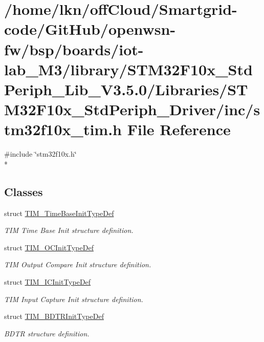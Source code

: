 \hypertarget{iot-lab___m3_2library_2_s_t_m32_f10x___std_periph___lib___v3_85_80_2_libraries_2_s_t_m32_f10x___9dc3c5d9a4f25b71424760fe6601bdaf}{}\section{/home/lkn/off\+Cloud/\+Smartgrid-\/code/\+Git\+Hub/openwsn-\/fw/bsp/boards/iot-\/lab\+\_\+\+M3/library/\+S\+T\+M32\+F10x\+\_\+\+Std\+Periph\+\_\+\+Lib\+\_\+\+V3.5.0/\+Libraries/\+S\+T\+M32\+F10x\+\_\+\+Std\+Periph\+\_\+\+Driver/inc/stm32f10x\+\_\+tim.h File Reference}
\label{iot-lab___m3_2library_2_s_t_m32_f10x___std_periph___lib___v3_85_80_2_libraries_2_s_t_m32_f10x___9dc3c5d9a4f25b71424760fe6601bdaf}
{\ttfamily \#include \char`\"{}stm32f10x.\+h\char`\"{}}\\*
\subsection*{Classes}
\begin{DoxyCompactItemize}
\item 
struct \hyperlink{struct_t_i_m___time_base_init_type_def}{T\+I\+M\+\_\+\+Time\+Base\+Init\+Type\+Def}
\begin{DoxyCompactList}\small\item\em T\+IM Time Base Init structure definition. \end{DoxyCompactList}\item 
struct \hyperlink{struct_t_i_m___o_c_init_type_def}{T\+I\+M\+\_\+\+O\+C\+Init\+Type\+Def}
\begin{DoxyCompactList}\small\item\em T\+IM Output Compare Init structure definition. \end{DoxyCompactList}\item 
struct \hyperlink{struct_t_i_m___i_c_init_type_def}{T\+I\+M\+\_\+\+I\+C\+Init\+Type\+Def}
\begin{DoxyCompactList}\small\item\em T\+IM Input Capture Init structure definition. \end{DoxyCompactList}\item 
struct \hyperlink{struct_t_i_m___b_d_t_r_init_type_def}{T\+I\+M\+\_\+\+B\+D\+T\+R\+Init\+Type\+Def}
\begin{DoxyCompactList}\small\item\em B\+D\+TR structure definition. \end{DoxyCompactList}\end{DoxyCompactItemize}
